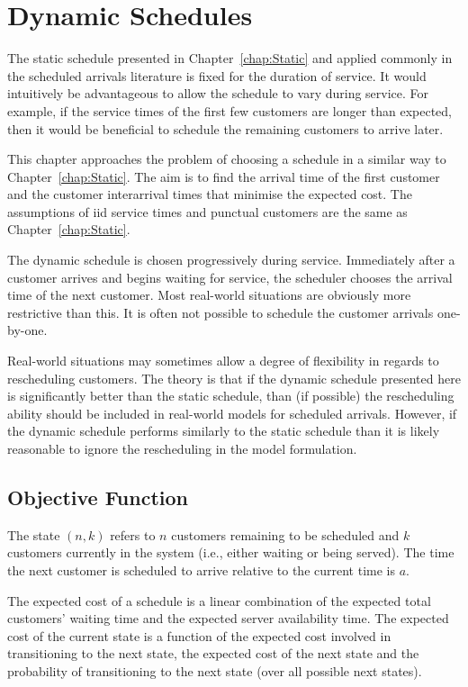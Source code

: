 \chapter{Dynamic Schedules}
\label{chap:Dynamic}
The static schedule presented in Chapter~\ref{chap:Static} and applied commonly in the scheduled arrivals literature is fixed for the duration of service. It would intuitively be advantageous to allow the schedule to vary during service. For example, if the service times of the first few customers are longer than expected, then it would be beneficial to schedule the remaining customers to arrive later.

This chapter approaches the problem of choosing a schedule in a similar way to Chapter~\ref{chap:Static}. The aim is to find the arrival time of the first customer and the customer interarrival times that minimise the expected cost. The assumptions of iid service times and punctual customers are the same as Chapter~\ref{chap:Static}.

The dynamic schedule is chosen progressively during service. Immediately after a customer arrives and begins waiting for service, the scheduler chooses the arrival time of the next customer. Most real-world situations are obviously more restrictive than this. It is often not possible to schedule the customer arrivals one-by-one.

Real-world situations may sometimes allow a degree of flexibility in regards to rescheduling customers. The theory is that if the dynamic schedule presented here is significantly better than the static schedule, than (if possible) the rescheduling ability should be included in real-world models for scheduled arrivals. However, if the dynamic schedule performs similarly to the static schedule than it is likely reasonable to ignore the rescheduling in the model formulation.

\section{Objective Function}
The state $(n, k)$ refers to $n$ customers remaining to be scheduled and $k$ customers currently in the system (i.e., either waiting or being served). The time the next customer is scheduled to arrive relative to the current time is $a$.

The expected cost of a schedule is a linear combination of the expected total customers' waiting time and the expected server availability time. The expected cost of the current state is a function of the expected cost involved in transitioning to the next state, the expected cost of the next state and the probability of transitioning to the next state (over all possible next states).

